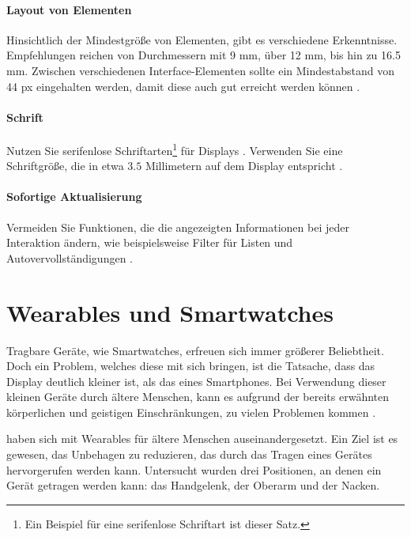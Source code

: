 \paragraph{Layout von Elementen}
Hinsichtlich der Mindestgröße von Elementen, gibt es verschiedene Erkenntnisse. Empfehlungen reichen von Durchmessern mit 9 mm\cite{Burkhard:2012:Evaluating-Touchscreen-Interfaces}, über 12 mm\cite{Guerreiro:2010:Towards-Accessible-Touch}, bis hin zu 16.5 mm\cite{Murata:2005:Usability-of-Touch-Panel-Interfaces}. Zwischen verschiedenen Interface-Elementen sollte ein Mindestabstand von 44 px eingehalten werden, damit diese auch gut erreicht werden können \cite{Almeida:2015:Recommendations-for-the-Development-of-Web-Interfaces}.

\paragraph{Schrift}
Nutzen Sie serifenlose Schriftarten\footnote{\textsf{Ein Beispiel für eine serifenlose Schriftart ist dieser Satz.}} für Displays \cite{Almeida:2015:Recommendations-for-the-Development-of-Web-Interfaces}\cite{Darroch:2005:The-Effect-of-Age-and-Font-Size}. Verwenden Sie eine Schriftgröße, die in etwa $ 3.5 $ Millimetern auf dem Display entspricht \cite{Darroch:2005:The-Effect-of-Age-and-Font-Size}.

\paragraph{Sofortige Aktualisierung}
Vermeiden Sie Funktionen, die die angezeigten Informationen bei jeder Interaktion ändern, wie beispielsweise Filter für Listen und Autovervollständigungen \cite{Almeida:2015:Recommendations-for-the-Development-of-Web-Interfaces}.

\section{Wearables und Smartwatches}

Tragbare Geräte, wie Smartwatches, erfreuen sich immer größerer Beliebtheit. Doch ein Problem, welches diese mit sich bringen, ist die Tatsache, dass das Display deutlich kleiner ist, als das eines Smartphones. Bei Verwendung dieser kleinen Geräte durch ältere Menschen, kann es aufgrund der bereits erwähnten körperlichen und geistigen Einschränkungen, zu vielen Problemen kommen \cite{Huang:2016:Design-of-Smart-Watch}.

\textcite{Fang:2014:A-New-Smart-Wearable-Device} haben sich mit Wearables für ältere Menschen auseinandergesetzt. Ein Ziel ist es gewesen, das Unbehagen zu reduzieren, das durch das Tragen eines Gerätes hervorgerufen werden kann. Untersucht wurden drei Positionen, an denen ein Gerät getragen werden kann: das Handgelenk, der Oberarm und der Nacken.

